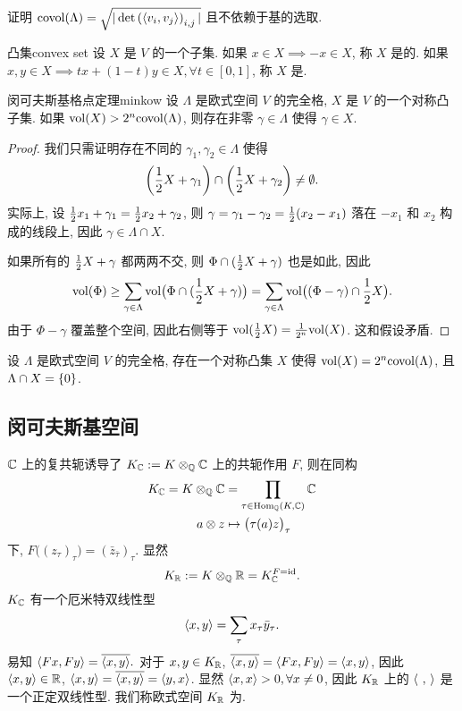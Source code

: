 \begin{exercise}
证明 ${\mathrm{covol}}(\Lambda)=\sqrt{|\det\left(\langle{v_i,v_j}\rangle\right)_{i,j}|}$ 且不依赖于基的选取.
\end{exercise}

\begin{definition}{凸集}{convex set}
设 $X$ 是 $V$ 的一个子集. 如果 $x\in X\implies -x\in X$, 称 $X$ 是的. 如果 $x,y\in X\implies tx+(1-t)y\in X,\forall t\in [0,1]$, 称 $X$ 是.
\end{definition}

\begin{theorem}{闵可夫斯基格点定理}{minkow}
设 $\Lambda$ 是欧式空间 $V$ 的完全格, $X$ 是 $V$ 的一个对称凸子集. 如果 ${\mathrm{vol}}(X)>2^n{\mathrm{covol}}(\Lambda)$, 则存在非零 $\gamma\in\Lambda$ 使得 $\gamma\in X$.
\end{theorem}
\begin{proof}
我们只需证明存在不同的 $\gamma_1,\gamma_2\in\Lambda$ 使得
  \[\left(\frac{1}{2} X+\gamma_1\right)\cap \left(\frac{1}{2} X+\gamma_2\right)\neq \emptyset.\]
实际上, 设 $\frac{1}{2} x_1+\gamma_1=\frac{1}{2} x_2+\gamma_2$, 则 $\gamma=\gamma_1-\gamma_2=\frac{1}{2}(x_2-x_1)$ 落在 $-x_1$ 和 $x_2$ 构成的线段上, 因此 $\gamma\in \Lambda\cap X$.

如果所有的 $\frac{1}{2} X+\gamma$ 都两两不交, 则 $\Phi\cap (\frac{1}{2} X+\gamma)$ 也是如此, 因此
  \[{\mathrm{vol}}(\Phi)\ge \sum_{\gamma\in \Lambda} {\mathrm{vol}}\bigl(\Phi\cap (\frac{1}{2} X+\gamma)\bigr)=\sum_{\gamma\in \Lambda} {\mathrm{vol}}\bigl((\Phi-\gamma)\cap \frac{1}{2} X\bigr).\]
由于 $\Phi-\gamma$ 覆盖整个空间, 因此右侧等于 ${\mathrm{vol}}(\frac{1}{2} X)=\frac{1}{2^n}{\mathrm{vol}}(X)$. 这和假设矛盾.
\end{proof}

\begin{exercise}
设 $\Lambda$ 是欧式空间 $V$ 的完全格, 存在一个对称凸集 $X$ 使得 ${\mathrm{vol}}(X)=2^n{\mathrm{covol}}(\Lambda)$, 且 $\Lambda\cap X=\left\{0\right\}$.
\end{exercise}


\subsection{闵可夫斯基空间}
${\mathbb{C}}$ 上的复共轭诱导了 $K_{\mathbb{C}}:=K\otimes_{\mathbb{Q}} {\mathbb{C}}$ 上的共轭作用 $F$, 则在同构
  \[\begin{split}
	K_{\mathbb{C}}=K\otimes_{\mathbb{Q}} {\mathbb{C}}&=\prod_{\tau\in{\mathrm{Hom}}_{\mathbb{Q}}(K,{\mathbb{C}})} {\mathbb{C}}\\
	a\otimes z&\mapsto \bigl(\tau(a)z\bigr)_\tau
	\end{split}\]
下, $F\bigl((z_\tau)_\tau\bigr)=(\bar z_{\bar \tau})_\tau$. 显然
  \[K_{\mathbb{R}}:=K\otimes_{\mathbb{Q}} {\mathbb{R}}=K_{\mathbb{C}}^{F={\mathrm{id}}}.\]
$K_{\mathbb{C}}$ 有一个厄米特双线性型
  \[\langle{x,y}\rangle=\sum_\tau x_\tau\bar y_\tau.\]
易知 $\langle{Fx,Fy}\rangle=\overline{\langle{x,y}\rangle}.$ 对于 $x,y\in K_{\mathbb{R}}$, $\overline{\langle{x,y}\rangle}=\langle{Fx,Fy}\rangle=\langle{x,y}\rangle$, 因此 $\langle{x,y}\rangle\in{\mathbb{R}}$, $\langle{x,y}\rangle=\overline{\langle{x,y}\rangle}=\langle{y,x}\rangle$. 显然 $\langle{x,x}\rangle>0,\forall x\neq 0$, 因此 $K_{\mathbb{R}}$ 上的 $\langle{~,~}\rangle$ 是一个正定双线性型. 我们称欧式空间 $K_{\mathbb{R}}$ 为. 

